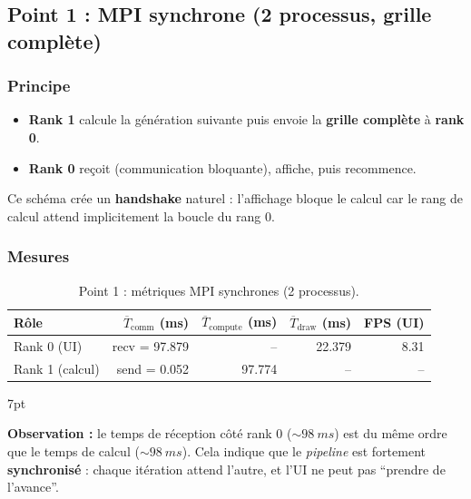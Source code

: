 \documentclass[11pt,a4paper]{article}
\newenvironment{formal}{%
\def\FrameCommand{%
  \hspace{1pt}%
  {\color{enstaBleuFonce}\vrule width 2pt}%
  {\color{formalshade}\vrule width 4pt}%
  \colorbox{formalshade}%
}%
\MakeFramed{\advance\hsize-\width\FrameRestore}%
\noindent\hspace{-4.55pt}%
\begin{adjustwidth}{}{7pt}%
\vspace{4pt}%
}{%
\vspace{4pt}\end{adjustwidth}\endMakeFramed%
}
\begin{document}
\subsection{Point 1 : MPI synchrone (2 processus, grille complète)}

\subsubsection{Principe}

\begin{itemize}[leftmargin=1.2em]
  \item \textbf{Rank 1} calcule la génération suivante puis envoie la \textbf{grille complète} à \textbf{rank 0}.
  \item \textbf{Rank 0} reçoit (communication bloquante), affiche, puis recommence.
\end{itemize}

Ce schéma crée un \textbf{handshake} naturel : l’affichage bloque le calcul car le rang de calcul attend implicitement la boucle du rang 0.

\subsubsection{Mesures}

\begin{table}[H]
  \centering
  \small
  \caption{Point 1 : métriques MPI synchrones (2 processus).}
  \label{tab:mpi-p1}
  \begin{tabular}{@{}lrrrr@{}}
    \toprule
    Rôle & $\overline{T}_{\text{comm}}$ (ms) & $\overline{T}_{\text{compute}}$ (ms) & $\overline{T}_{\text{draw}}$ (ms) & FPS (UI) \\
    \midrule
    Rank 0 (UI) & recv = 97.879 & -- & 22.379 & 8.31 \\
    Rank 1 (calcul) & send = 0.052 & 97.774 & -- & -- \\
    \bottomrule
  \end{tabular}
\end{table}

\begin{formal}
\textbf{Observation :} le temps de réception côté rank 0 ($\sim \SI{98}{ms}$) est du même ordre que le temps de calcul ($\sim \SI{98}{ms}$). Cela indique que le \emph{pipeline} est fortement \textbf{synchronisé} : chaque itération attend l’autre, et l’UI ne peut pas ``prendre de l’avance''.
\end{formal}
\end{document}
